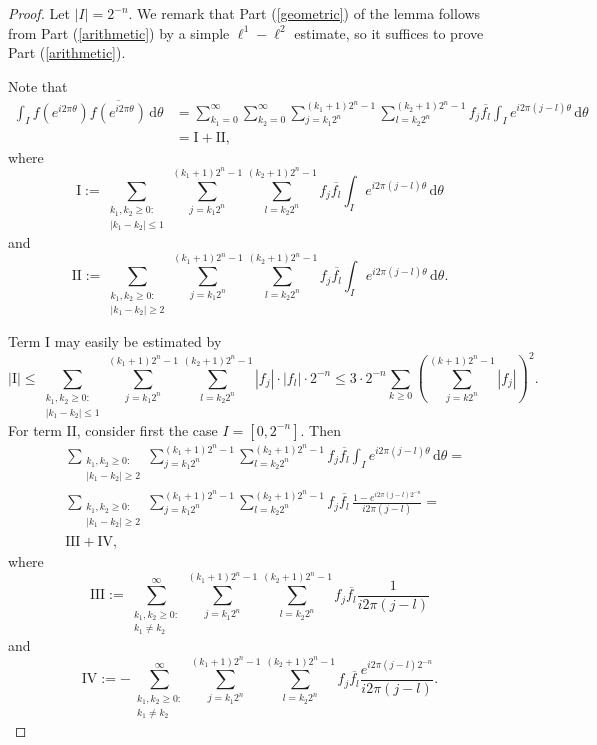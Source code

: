\documentclass[a4paper, leqno, 10pt]{amsart}
\numberwithin{equation}{section}
\newcommand{\dd}{\mathrm{d}}
\newcommand{\I}{\mathrm{I}}
\newcommand{\II}{\mathrm{II}}
\begin{document}
\begin{proof} Let $|I| = 2^{-n}$.
We remark that Part (\ref{geometric}) of the lemma follows from Part (\ref{arithmetic}) by a simple $\ell^1 - \ell^2$ estimate, so it suffices to prove Part (\ref{arithmetic}).

Note that
\begin{align*}
\int_I f(e^{i 2 \pi \theta})\overline{f(e^{i 2 \pi \theta})} \, \dd \theta & = \sum_{k_1 = 0}^\infty\sum_{k_2=0}^\infty \sum_{j=k_1 2^{n}}^{(k_1+1)2^{n}-1}\sum_{l=k_2 2^n}^{(k_2 +1) 2^{n}-1} f_j \overline{f_l} \int_I e ^{i 2\pi (j-l) \theta} \, \dd \theta \\
&=  \I + \II,
\end{align*}
where
\[
\I := \sum_{\substack{ k_1, k_2 \geq 0:\\ |k_1-k_2| \leq 1}} \sum_{j=k_1 2^{n}}^{(k_1+1)2^{n}-1}\sum_{l=k_2 2^n}^{(k_2 +1) 2^{n}-1} f_j \overline{f_l} \int_I e^{i 2\pi (j-l) \theta} \, \dd \theta
\]
and
\[
\II := \sum_{\substack{ k_1, k_2 \geq 0:\\ |k_1-k_2| \geq 2}} \sum_{j=k_1 2^{n}}^{(k_1+1)2^{n}-1}\sum_{l=k_2 2^n}^{(k_2 +1) 2^{n}-1} f_j \overline{f_l} \int_I e^{i 2\pi (j-l) \theta} \, \dd \theta .
\]

Term $\I$ may easily be estimated by
\[
| \I | \leq
\sum_{\substack{k_1, k_2 \geq 0:\\ |k_1-k_2| \leq 1}} \sum_{j=k_1 2^{n}}^{(k_1+1)2^{n}-1}\sum_{l=k_2 2^n}^{(k_2 +1) 2^{n}-1} | f_j | \cdot |  f_l | \cdot 2^{-n}
\leq 3 \cdot 2^{-n} \sum_{k \geq 0} \left(\sum_{j=k 2^{n}}^{(k+1)2^{n}-1} |f_j| \right)^2.
\]
For term $\II$, consider first the case $I = [0,2^{-n}]$. Then
\begin{align*}
&\sum_{\substack{k_1, k_2 \geq 0:\\ |k_1-k_2| \geq 2}} \sum_{j=k_1 2^{n}}^{(k_1+1)2^{n}-1}\sum_{l=k_2 2^n}^{(k_2 +1) 2^{n}-1} f_j \overline{f_l} \int_I e^{i 2\pi (j-l) \theta} \, \dd \theta = \\
& \sum_{\substack{k_1, k_2 \geq 0:\\ |k_1-k_2| \geq 2}}
\sum_{j=k_1 2^{n}}^{(k_1+1)2^{n}-1} \sum_{l=k_2 2^n}^{(k_2 +1) 2^{n}-1} f_j \overline{f_l} \, \frac{1 - e^{i 2 \pi (j-l) 2^{-n}}}{i 2\pi (j-l)} =  \\
&  \text{III} + \text{IV},
\end{align*}
where
\[
\text{III} :=  \sum_{\substack{ k_1, k_2 \geq  0:\\ k_1 \neq k_2} }^\infty 
\sum_{j = k_1 2^{n}}^{(k_1+1) 2^{n}-1} 
\sum_{l = k_2 2^{n}}^{(k_2+1) 2^{n}-1} f_{j} \overline{f_{l}} \frac{1}{i 2\pi ( j-l)}
\]
and
\[
\text{IV} := - \sum_{ \substack{k_1, k_2 \geq  0: \\ k_1 \neq k_2 }}^\infty 
\sum_{j = k_1 2^{n}}^{(k_1+1) 2^{n}-1} 
\sum_{l = k_2 2^{n}}^{(k_2+1) 2^{n}-1}  f_{j} \overline{f_{l}}  \frac{  e^{i 2 \pi (j-l) 2^{-n}}}{i 2\pi  ( j-l)} . 
\]


\end{proof}
\end{document}
